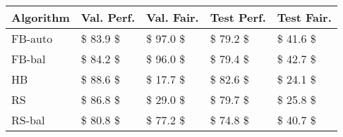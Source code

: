 \begin{tabular}{lllll}
\toprule
Algorithm & Val. Perf. & Val. Fair. & Test Perf. & Test Fair. \\
\midrule
  FB-auto &   \$ 83.9 \$ &   \$ 97.0 \$ &   \$ 79.2 \$ &   \$ 41.6 \$ \\
   FB-bal &   \$ 84.2 \$ &   \$ 96.0 \$ &   \$ 79.4 \$ &   \$ 42.7 \$ \\
       HB &   \$ 88.6 \$ &   \$ 17.7 \$ &   \$ 82.6 \$ &   \$ 24.1 \$ \\
       RS &   \$ 86.8 \$ &   \$ 29.0 \$ &   \$ 79.7 \$ &   \$ 25.8 \$ \\
   RS-bal &   \$ 80.8 \$ &   \$ 77.2 \$ &   \$ 74.8 \$ &   \$ 40.7 \$ \\
\bottomrule
\end{tabular}
